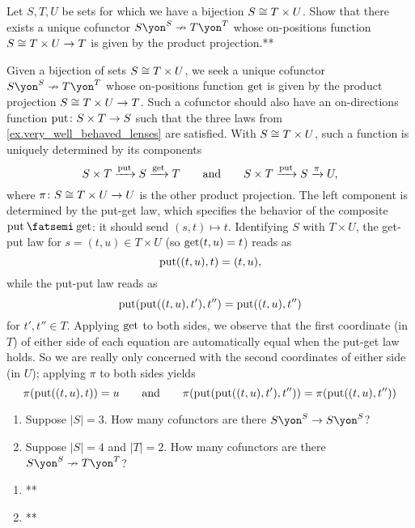 \documentclass[Book-Poly]{subfiles}
\begin{document}
\begin{exercise}\label{exc.well_behaved_boring}
Let $S,T,U$ be sets for which we have a bijection $S\cong T\times U$.
Show that there exists a unique cofunctor $S\yon^S\cof T\yon^T$ whose on-positions function $S\cong T\times U\to T$ is given by the product projection.**
\begin{solution}
Given a bijection of sets $S\cong T\times U$, we seek a unique cofunctor $S\yon^S\cof T\yon^T$ whose on-positions function $\mathrm{get}$ is given by the product projection $S\cong T\times U\to T$.
Such a cofunctor should also have an on-directions function $\mathrm{put}\colon S\times T\to S$ such that the three laws from \cref{ex.very_well_behaved_lenses} are satisfied.
With $S\cong T\times U$, such a function is uniquely determined by its components
\[
    S\times T\xrightarrow{\mathrm{put}} S\xrightarrow{\mathrm{get}} T \qquad\text{and}\qquad S\times T\xrightarrow{\mathrm{put}} S\xrightarrow{\pi} U,
\]
where $\pi\colon S\cong T\times U\to U$ is the other product projection.
The left component is determined by the put-get law, which specifies the behavior of the composite $\lensput\then\lensget$: it should send $(s,t)\mapsto t$.
Identifying $S$ with $T\times U$, the get-put law for $s=(t,u)\in T\times U$ (so $\mathrm{get}(t,u)=t$) reads as
\[
    \mathrm{put}((t,u),t)=(t,u),
\]
while the put-put law reads as
\[
    \mathrm{put}(\mathrm{put}((t,u),t'),t'')=\mathrm{put}((t,u),t'')
\]
for $t',t''\in T$.
Applying $\mathrm{get}$ to both sides, we observe that the first coordinate (in $T$) of either side of each equation are automatically equal when the put-get law holds.
So we are really only concerned with the second coordinates of either side (in $U$); applying $\pi$ to both sides yields
\[
    \pi(\mathrm{put}((t,u),t))=u \qquad\text{and}\qquad \pi(\mathrm{put}(\mathrm{put}((t,u),t'),t''))=\pi(\mathrm{put}((t,u),t''))
\]
\end{solution}
\end{exercise}

\begin{exercise}\label{exc.how_many_vwbls}
\begin{enumerate}
	\item Suppose $|S|=3$. How many cofunctors are there $S\yon^S\to S\yon^S$?
	\item Suppose $|S|=4$ and $|T|=2$. How many cofunctors are there $S\yon^S\cof T\yon^T$?
\qedhere
\end{enumerate}
\begin{solution}
\begin{enumerate}
    \item **
    \item **
\end{enumerate}
\end{solution}
\end{exercise}
\end{document}
